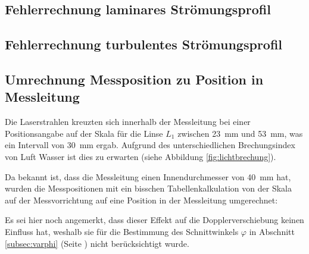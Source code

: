\clearpage
\subsection{Fehlerrechnung laminares Str\"omungsprofil}
\label{app:python:errorLaminar}


\clearpage
\subsection{Fehlerrechnung turbulentes Str\"omungsprofil}
\label{app:python:errorTurbulent}



\clearpage
\subsection{Umrechnung Messposition zu Position in Messleitung}
\label{app:messposition}

Die  Laserstrahlen   kreuzten  sich   innerhalb  der  Messleitung   bei  einer
Positionsangabe   auf    der   Skala   f\"ur   die    Linse   $L_1$   zwischen
\SI{23}{\milli\meter}   und  \SI{53}{\milli\meter},   was  ein  Intervall  von
\SI{30}{\milli\meter} ergab. Aufgrund des unterschiedlichen Brechungsindex von
Luft Wasser ist dies zu erwarten (siehe Abbildung \ref{fig:lichtbrechung}).

Da   bekannt   ist,   dass   die  Messleitung   einen   Innendurchmesser   von
\SI{40}{\milli\meter}  hat,   wurden  die  Messpositionen  mit   ein  bisschen
Tabellenkalkulation von der Skala auf der Messvorrichtung auf eine Position in
der Messleitung umgerechnet:


Es sei  hier noch  angemerkt, dass dieser  Effekt auf  die Dopplerverschiebung
keinen  Einfluss hat,  weshalb  sie f\"ur  die  Bestimmung des  Schnittwinkels
$\varphi$  in  Abschnitt \ref{subsec:varphi}  (Seite  \pageref{subsec:varphi})
nicht ber\"ucksichtigt wurde.

